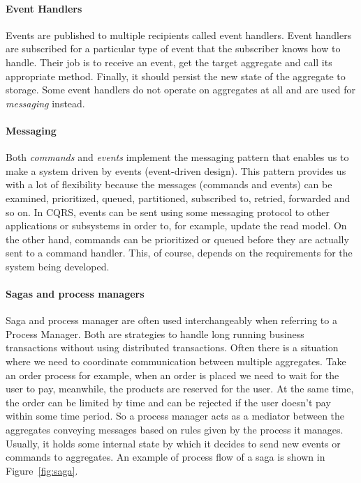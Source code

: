 \documentclass{book}
\begin{document}
\paragraph{Event Handlers}\label{event-handlers}

Events are published to multiple recipients called event handlers. Event
handlers are subscribed for a particular type of event that the
subscriber knows how to handle. Their job is to receive an event, get
the target aggregate and call its appropriate method. Finally, it should
persist the new state of the aggregate to storage. Some event handlers
do not operate on aggregates at all and are used for \emph{messaging}
instead.~\cite{journey}

\paragraph{Messaging}\label{messaging}

Both \emph{commands} and \emph{events} implement the messaging pattern
that enables us to make a system driven by events (event-driven design).
This pattern provides us with a lot of flexibility because the messages
(commands and events) can be examined, prioritized, queued, partitioned,
subscribed to, retried, forwarded and so on. In CQRS, events can be sent
using some messaging protocol to other applications or subsystems in
order to, for example, update the read model. On the other hand,
commands can be prioritized or queued before they are actually sent to a
command handler. This, of course, depends on the requirements for the
system being developed.

\paragraph{Sagas and process managers}\label{sagas-and-process-managers}

Saga and process manager are often used interchangeably when referring
to a Process Manager. Both are strategies to handle long running
business transactions without using distributed transactions. Often
there is a situation where we need to coordinate communication between
multiple aggregates. Take an order process for example, when an order is
placed we need to wait for the user to pay, meanwhile, the products are
reserved for the user. At the same time, the order can be limited by
time and can be rejected if the user doesn't pay within some time
period. So a process manager acts as a mediator between the aggregates
conveying messages based on rules given by the process it manages.
Usually, it holds some internal state by which it decides to send new
events or commands to aggregates. An example of process flow of a saga
is shown in Figure~\ref{fig:saga}.~\cite{journey}
\end{document}
